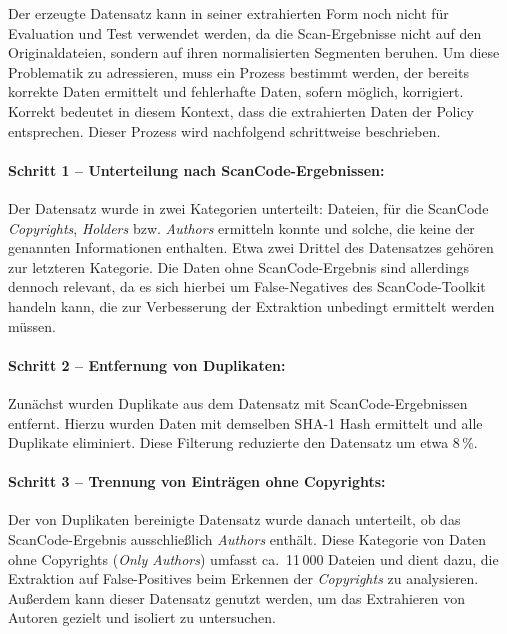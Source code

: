 Der erzeugte Datensatz kann in seiner extrahierten Form noch nicht für Evaluation und Test verwendet werden, da die Scan-Ergebnisse nicht auf den Originaldateien, sondern auf ihren normalisierten Segmenten beruhen.
Um diese Problematik zu adressieren, muss ein Prozess bestimmt werden, der bereits korrekte Daten ermittelt und fehlerhafte Daten, sofern möglich, korrigiert.
Korrekt bedeutet in diesem Kontext, dass die extrahierten Daten der Policy entsprechen.
Dieser Prozess wird nachfolgend schrittweise beschrieben.

\paragraph{Schritt 1 -- Unterteilung nach ScanCode-Ergebnissen:}
Der Datensatz wurde in zwei Kategorien unterteilt: Dateien, für die ScanCode \textit{Copyrights}, \textit{Holders} bzw. \textit{Authors} ermitteln konnte und solche, die keine der genannten Informationen enthalten.
Etwa zwei Drittel des Datensatzes gehören zur letzteren Kategorie.
Die Daten ohne ScanCode-Ergebnis sind allerdings dennoch relevant, da es sich hierbei um False-Negatives des ScanCode-Toolkit handeln kann, die zur Verbesserung der Extraktion unbedingt ermittelt werden müssen.

\paragraph{Schritt 2 -- Entfernung von Duplikaten:}
Zunächst wurden Duplikate aus dem Datensatz mit ScanCode-Ergebnissen entfernt.
Hierzu wurden Daten mit demselben SHA-1 Hash ermittelt und alle Duplikate eliminiert.
Diese Filterung reduzierte den Datensatz um etwa 8\,\%.

\paragraph{Schritt 3 -- Trennung von Einträgen ohne Copyrights:}
Der von Duplikaten bereinigte Datensatz wurde danach unterteilt, ob das ScanCode-Ergebnis ausschließlich \textit{Authors} enthält.
Diese Kategorie von Daten ohne Copyrights (\textit{Only Authors}) umfasst ca.\ 11\,000 Dateien und dient dazu, die Extraktion auf False-Positives beim Erkennen der \textit{Copyrights} zu analysieren.
Außerdem kann dieser Datensatz genutzt werden, um das Extrahieren von Autoren gezielt und isoliert zu untersuchen.

